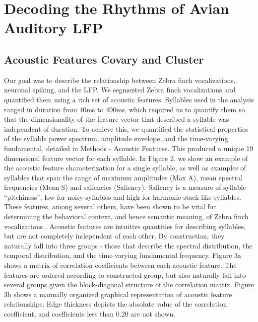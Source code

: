 \chapter{Decoding the Rhythms of Avian Auditory LFP}

\section{Acoustic Features Covary and Cluster}

Our goal was to describe the relationship between Zebra finch vocalizations, neuronal spiking, and the LFP. We segmented Zebra finch vocalizations and quantified them using a rich set of acoustic features. Syllables used in the analysis ranged in duration from 40ms to 400ms, which required us to quantify them so that the dimensionality of the feature vector that described a syllable was independent of duration. To achieve this, we quantified the statistical properties of the syllable power spectrum, amplitude envelope, and the time-varying fundamental, detailed in Methods - Acoustic Features. This produced a unique 19 dimensional feature vector for each syllable.
    In Figure 2, we show an example of the acoustic feature characterization for a single syllable, as well as examples of syllables that span the range of maximum amplitudes (Max A), mean spectral frequencies (Mean S) and saliencies (Saliency). Saliency is a measure of syllable “pitchiness”, low for noisy syllables and high for harmonic-stack-like syllables. These features, among several others, have been shown to be vital for determining the behavioral context, and hence semantic meaning, of Zebra finch vocalizations \cite{Elie2015b}.
    Acoustic features are intuitive quantities for describing syllables, but are not completely independent of each other. By construction, they naturally fall into three groups - those that describe the spectral distribution, the temporal distribution, and the time-varying fundamental frequency. Figure 3a shows a matrix of correlation coefficients between each acoustic feature. The features are ordered according to constructed group, but also naturally fall into several groups given the block-diagonal structure of the correlation matrix. Figure 3b shows a manually organized graphical representation of acoustic feature relationships. Edge thickness depicts the absolute value of the correlation coefficient, and coefficients less than 0.20 are not shown.
